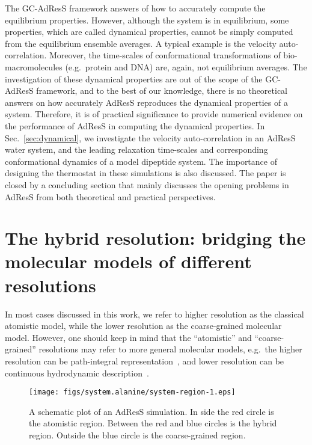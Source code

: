 \documentclass[epjST]{svjour}
\begin{document}
The GC-AdResS framework answers of how to accurately compute the  equilibrium properties.
However, although the system is in equilibrium,
some properties, which are called dynamical properties, cannot be simply computed from the equilibrium ensemble averages.
A typical example is the velocity auto-correlation.
Moreover, the time-scales of conformational transformations
of bio-macromolecules (e.g.~protein and DNA)
are, again, not equilibrium averages.
The investigation of these  dynamical properties are out of the scope of the GC-AdResS framework,
and to the best of our knowledge, there is no theoretical answers on how accurately  AdResS reproduces the 
dynamical properties of a system.
Therefore, it is of practical significance to  provide numerical
evidence on the performance of AdResS in computing the dynamical properties.
In Sec.~\ref{sec:dynamical}, we investigate the
velocity auto-correlation in an AdResS water system, and the
leading relaxation time-scales and corresponding conformational dynamics of
a model dipeptide system.
The importance of designing the thermostat in these simulations
is also discussed.
The paper is closed by a concluding section
that mainly discusses the opening problems in AdResS from both theoretical
and practical perspectives.

\section{The hybrid resolution: bridging the molecular models of different resolutions}
\label{sec:design}

In most cases discussed in this work, we refer to higher resolution as the classical atomistic model, while
the lower resolution as the coarse-grained molecular model. However,
one should keep in mind that the ``atomistic'' and ``coarse-grained'' resolutions
may refer to more general molecular models, e.g.~the higher resolution can be
path-integral representation~\cite{poma2010classical}, and lower resolution can be continuous
hydrodynamic description~\cite{delgado2009coupling}.

\begin{figure}
  \centering
  \texttt{[image: figs/system.alanine/system-region-1.eps]}
  \caption{A schematic plot of an AdResS simulation. In side the red circle is the atomistic region. Between the red and blue circles is the hybrid region. Outside the blue circle is the coarse-grained region.}
  \label{fig:sys-region}
\end{figure}
\end{document}
